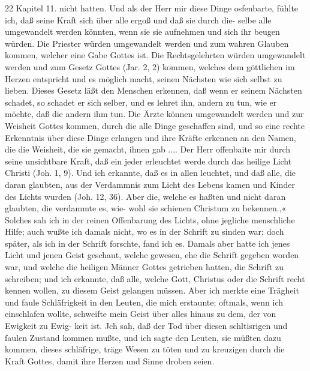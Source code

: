 22 Kapitel 11.
nicht hatten. Und als der Herr mir diese Dinge osfenbarte, fühlte
ich, daß seine Kraft sich über alle ergoß und daß sie durch die-
selbe alle umgewandelt werden könnten, wenn sie sie aufnehmen und
sich ihr beugen würden. Die Priester würden umgewandelt werden
und zum wahren Glauben kommen, welcher eine Gabe Gottes
ist. Die Rechtsgelehrten würden umgewandelt werden und zum
Gesetz Gottes (Jar. 2, 2) kommen, welches dem göttlichen im
Herzen entspricht und es möglich macht, seinen Nächsten wie sich
selbst zu lieben. Dieses Gesetz läßt den Menschen erkennen, daß
wenn er seinem Nächsten schadet, so schadet er sich selber, und
es lehret ihn, andern zu tun, wie er möchte, daß die andern ihm
tun. Die Ärzte können umgewandelt werden und zur Weisheit
Gottes kommen, durch die alle Dinge geschaffen sind, und so
eine rechte Erkenntnis über diese Dinge erlangen und ihre Kräfte
erkennen an den Namen, die die Weisheit, die sie gemacht, ihnen
gab ....
Der Herr offenbaite mir durch seine unsichtbare Kraft, daß
ein jeder erleuchtet werde durch das heilige Licht Christi (Joh. 1, 9).
Und ich erkannte, daß es in allen leuchtet, und daß alle, die
daran glaubten, aus der Verdammnis zum Licht des Lebens
kamen und Kinder des Lichts wurden (Joh. 12, 36). Aber die,
welche es haßten und nicht daran glaubten, die verdammte es, wie-
wohl sie schienen Christum zu bekennen.,« Solches sah ich in der
reinen Offenbarung des Lichts, ohne jegliche menschliche Hilfe;
auch wußte ich damals nicht, wo es in der Schrift zu sinden
war; doch später, als ich in der Schrift forschte, fand ich es.
Damals aber hatte ich jenes Licht und jenen Geist geschaut, welche
gewesen, ehe die Schrift gegeben worden war, und welche die
heiligen Männer Gottes getrieben hatten, die Schrift zu schreiben;
und ich erkannte, daß alle, welche Gott, Christus oder die Schrift
recht kennen wollen, zu diesem Geist gelangen müssen. Aber ich
merkte eine Trägheit und faule Schläfrigkeit in den Leuten, die
mich erstaunte; oftmals, wenn ich einschlafen wollte, schweifte
mein Geist über alles hinaus zu dem, der von Ewigkeit zu Ewig-
keit ist. Jch sah, daß der Tod über diesen schltisrigen und faulen
Zustand kommen mußte, und ich sagte den Leuten, sie müßten
dazu kommen, dieses schläfrige, träge Wesen zu töten und zu
kreuzigen durch die Kraft Gottes, damit ihre Herzen und Sinne
droben seien.



